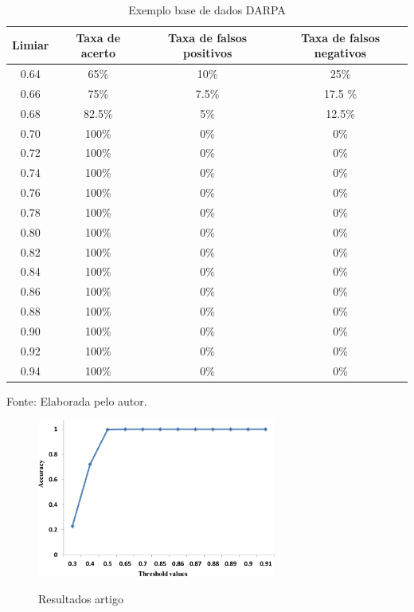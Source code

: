   \begin{table}[htb]
  	\centering
  	\begin{threeparttable}
  		\caption{Exemplo base de dados DARPA}
  		\label{Tab:ResultsDARPA}
  		\begin{tabular}{c c c c}
  			\toprule
  			\textbf{Limiar} & \textbf{Taxa de acerto} & \textbf{Taxa de falsos positivos} & \textbf{Taxa de falsos negativos}
  			\\ \midrule
  			0.64 &  65\% &  10\%& 25\%   \\ \midrule
  			0.66 &  75\% & 7.5\% & 17.5 \%   \\ \midrule
  			0.68 &  82.5\%  & 5\% & 12.5\%   \\ \midrule
  			0.70 &  100\%  &  0\% & 0\%   \\ \midrule
  			0.72 &  100\%  &  0\% & 0\%     \\ \midrule
  			0.74 &  100\%  & 0\% & 0\%    \\ \midrule
  			0.76 &  100\%  &  0\% & 0\%   \\ \midrule
  			0.78 &  100\%  &  0\% & 0\%   \\ \midrule
  			0.80 &  100\%  &  0\% & 0\%   \\ \midrule
  			0.82 &  100\%  &  0\% & 0\%   \\ \midrule
  			0.84 &  100\%  &  0\% & 0\%   \\ \midrule
  			0.86 &  100\%  &  0\% & 0\%   \\ \midrule
  			0.88 &  100\%  &  0\% & 0\%   \\ \midrule
  			0.90 &  100\%  &  0\% & 0\%   \\ \midrule
  			0.92 &  100\%  &  0\% & 0\%   \\ \midrule
   			0.94 &  100\%  & 0\% & 0\%   \\ \bottomrule
  		\end{tabular}
  		{Fonte: Elaborada pelo autor.}
  	\end{threeparttable}
  \end{table}
  
 \begin{figure}[htb]
 	\centering
 	\caption{Resultados artigo \cite{HOQUE201748} }
 	\includegraphics[width=0.7\textwidth]{figs/resultNHOQUE.jpg}\\
 	\label{fig:ResultsNHOQUE}
 \end{figure}


